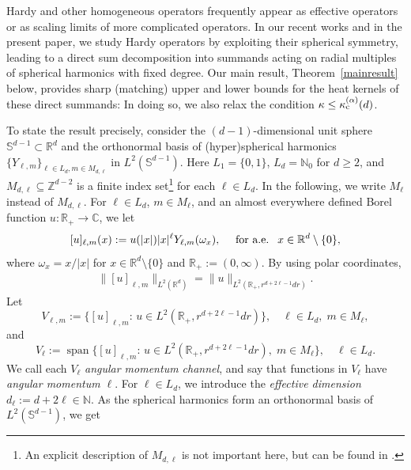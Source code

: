 \documentclass[12pt,reqno]{amsart}
\theoremstyle{definition}
\theoremstyle{remark}
\numberwithin{equation}{section}
\newcommand{\1}{\mathbbm{1}}
\newcommand{\C}{\mathbb{C}}
\newcommand{\N}{\mathbb{N}}
\newcommand{\R}{\mathbb{R}}
\newcommand{\Z}{\mathbb{Z}}
\DeclareMathOperator{\spann}{span}
\def\bs{\mathbb{S}}
\def\Rd{{\mathbb{R}^d}}
\begin{document}
Hardy and other homogeneous operators frequently appear as effective operators or as scaling limits of more complicated operators. In our recent works \cite{BogdanMerz2024, BogdanMerz2025, Bogdanetal2024} and in the present paper, we study Hardy operators by exploiting their spherical symmetry, leading to a direct sum decomposition into summands acting on radial multiples of spherical harmonics with fixed degree. Our main result, Theorem~\ref{mainresult} below, provides sharp (matching) upper and lower bounds for the heat kernels of these direct summands: In doing so, we also relax the condition $\kappa\leq\kappa_{\rm c}^{(\alpha)}(d)$.

To state the result precisely, consider the $(d-1)$-dimensional unit sphere $\bs^{d-1}\subset \Rd$ and the orthonormal basis of (hyper)spherical harmonics $\{Y_{\ell,m}\}_{\ell\in L_d,m\in M_{d,\ell}}$ in $L^2(\bs^{d-1})$. Here $L_1=\{0,1\}$, $L_d=\N_0$ for $d\geq2$, and $M_{d,\ell}\subseteq\Z^{d-2}$ is a finite index set\footnote{An explicit description of $M_{d,\ell}$ is not important here, but can be found in \cite{BogdanMerz2024}.} for each $\ell\in L_d$. In the following, we write $M_\ell$ instead of $M_{d,\ell}$.
%
For $\ell\in L_d$, $m\in M_\ell$, and an almost everywhere defined Borel function $u:\R_+\to \C$, we let
\begin{align}\index{$[u]_{\ell,m}$}
  \label{eq:defeqclassellm}
  [u]_{\ell,m}(x) := u(|x|) |x|^{\ell} Y_{\ell,m}(\omega_x),
  \quad \text{ for a.e. } \ x\in\R^d\setminus\{0\}, 
\end{align}
\noindent
where $\omega_x=x/|x|$ for $x\in\R^d\setminus\{0\}$ and $\R_+:=(0,\infty)$.
By using polar coordinates, 
\begin{align}
  \label{eq:isometry}
  \|[u]_{\ell,m}\|_{L^2(\R^d)} = \|u\|_{L^2(\R_+,r^{d+2\ell-1}dr)}.
\end{align}
Let
\begin{equation}
  \label{eq:defvelll2}
  V_{\ell,m} := \{ [u]_{\ell,m}:\, u\in L^2(\R_+,r^{d+2\ell-1}dr)\},
  \quad \ell\in L_d, \; m\in M_\ell,
\end{equation}and 
\begin{equation}
  \label{eq:defvelll2t}
  V_{\ell} := \spann\{ [u]_{\ell,m}:\, u\in L^2(\R_+,r^{d+2\ell-1}dr), \; m\in M_\ell\},
  \quad \ell\in L_d.
\end{equation}%
We call each $V_\ell$ \emph{angular momentum channel}, and say that functions in $V_{\ell}$ have \emph{angular momentum $\ell$}. For $\ell\in L_d$, we introduce the \emph{effective dimension} $d_\ell:=d+2\ell\in\N$. As the spherical harmonics form an orthonormal basis of $L^2(\bs^{d-1})$, we get
\end{document}
